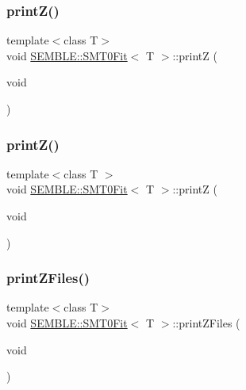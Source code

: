 \mbox{\label{structSEMBLE_1_1SMT0Fit_a6bea5ac00bfbb4338655f60bc936c59a}} 
\subsubsection{\texorpdfstring{printZ()}{printZ()}\hspace{0.1cm}{\footnotesize\ttfamily [1/2]}}
{\footnotesize\ttfamily template$<$class T$>$ \\
void \mbox{\hyperlink{structSEMBLE_1_1SMT0Fit}{S\+E\+M\+B\+L\+E\+::\+S\+M\+T0\+Fit}}$<$ T $>$\+::printZ (\begin{DoxyParamCaption}\item[{void}]{ }\end{DoxyParamCaption})}

\mbox{\label{structSEMBLE_1_1SMT0Fit_a6bea5ac00bfbb4338655f60bc936c59a}} 
\subsubsection{\texorpdfstring{printZ()}{printZ()}\hspace{0.1cm}{\footnotesize\ttfamily [2/2]}}
{\footnotesize\ttfamily template$<$class T $>$ \\
void \mbox{\hyperlink{structSEMBLE_1_1SMT0Fit}{S\+E\+M\+B\+L\+E\+::\+S\+M\+T0\+Fit}}$<$ T $>$\+::printZ (\begin{DoxyParamCaption}\item[{void}]{ }\end{DoxyParamCaption})}

\mbox{\label{structSEMBLE_1_1SMT0Fit_ad9381bac6df9a9ba07f13dac7316b56a}} 
\subsubsection{\texorpdfstring{printZFiles()}{printZFiles()}\hspace{0.1cm}{\footnotesize\ttfamily [1/2]}}
{\footnotesize\ttfamily template$<$class T$>$ \\
void \mbox{\hyperlink{structSEMBLE_1_1SMT0Fit}{S\+E\+M\+B\+L\+E\+::\+S\+M\+T0\+Fit}}$<$ T $>$\+::print\+Z\+Files (\begin{DoxyParamCaption}\item[{void}]{ }\end{DoxyParamCaption})}

